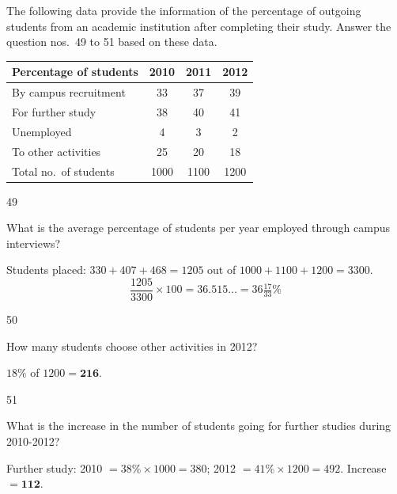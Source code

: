 \begin{context}
The following data provide the information of the percentage of outgoing students from an academic institution after completing their study. Answer the question nos.~49 to 51 based on these data.
\begin{center}\small
\begin{tabular}{lccc}\toprule \textbf{Percentage of students} & \textbf{2010} & \textbf{2011} & \textbf{2012}\\\midrule
By campus recruitment & 33 & 37 & 39\\ For further study & 38 & 40 & 41\\ Unemployed & 4 & 3 & 2\\ To other activities & 25 & 20 & 18\\\midrule
Total no.\ of students & 1000 & 1100 & 1200\\\bottomrule
\end{tabular}
\end{center}
\end{context}
\begin{question}{49}
{What is the average percentage of students per year employed through campus interviews?\par}
\begin{explain}
Students placed: $330+407+468=1205$ out of $1000+1100+1200=3300$.
\[\frac{1205}{3300}\times100=36.515\ldots=36\tfrac{17}{33}\%\]
\end{explain}
\end{question}

\begin{question}{50}
{How many students choose other activities in 2012?\par}
\begin{explain}
$18\%$ of $1200=\mathbf{216}$.
\end{explain}
\end{question}

\begin{question}{51}
{What is the increase in the number of students going for further studies during 2010-2012?\par}
\begin{explain}
Further study: 2010 $=38\%\times1000=380$; 2012 $=41\%\times1200=492$. Increase $=\mathbf{112}$.
\end{explain}
\end{question}

